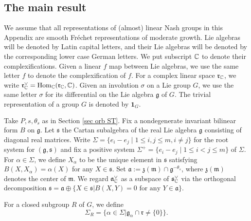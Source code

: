 \documentclass[11pt,letterpaper]{amsart}
\newcommand{\Hom}{\mathrm{Hom}}
\newcommand{\triv}{{\mathbf{1}}}
\renewcommand{\a}{\alpha}
\newcommand{\fa}{\mathfrak{a}}
\newcommand{\fg}{\mathfrak{g}}
\newcommand{\fm}{\mathfrak{m}}
\newcommand{\fr}{\mathfrak{r}}
\newcommand{\fs}{\mathfrak{s}}
\newcommand{\fz}{\mathfrak{z}}
\theoremstyle{plain}
\numberwithin{equation}{section}
\begin{document}
\subsection{The main result}
We assume that all representations of (almost) linear Nash groups in this Appendix are 
smooth Fr{\' e}chet representations of moderate growth. 
Lie algebras will be denoted by Latin capital letters, and their Lie algebras will be denoted by the corresponding lower case German letters. 
We put subscript ${\mathbb {C}}$ to denote their complexifications. 
Given a linear $f$ map between Lie algebras, we use the same letter $f$ to denote the complexification of $f$. 
For a complex linear space $\fr_{\BC}$, we write $\fr_{\BC}^{\vee}=\Hom_{\BC}(\fr_{\BC},\BC)$.  
Given an involution $\sigma$ on a Lie group $G$, we use the same letter $\sigma$ for its differential on the Lie algebra $\fg$ of $G$. 
The trivial representation of a group $G$ is denoted by $\triv_{G}$.





Take $P, s, \theta_s$ as in Section \ref{sec orb ST}.
Fix a nondegenerate invariant bilinear form $B$ on $\fg$. 
Let $\fs$ the Cartan subalgebra of the real Lie algebra $\fg$ consisting of diagonal real matrices. 
Write $\Sigma=\{e_i-e_j\mid 1\le i,j\le m, i\neq j\}$ for the root system for $(\fg,\fs)$ and fix a positive system $\Sigma^+=\{e_i-e_j\mid 1\le i<j\le m\}$ of $\Sigma$. 
For $\a \in \Sigma$, we define $X_{\a}$ to be the unique element in $\fs$ satisfying $B(X,X_{\a})=\a(X)$ for any $X\in\fs$. 
Set $\fa:=\fz(\fm)\cap\fg^{-\theta_s}$, where $\fz(\fm)$ denotes the center of $\fm$. 
We regard $\fa_{\BC}^{\vee}$ as a subspace of $\fs_{\BC}^{\vee}$ via the orthogonal decomposition $\fs=\fa\oplus\{X\in\fs | B(X,Y)=0\text{ for any $Y\in\fa$}\}$. 

For a closed subgroup $R$ of $G$, we define 
    \[
    \Sigma_{R}=\{\a\in\Sigma | \fg_{\a}\cap\fr\neq \{0\}\}.
    \]
\end{document}

